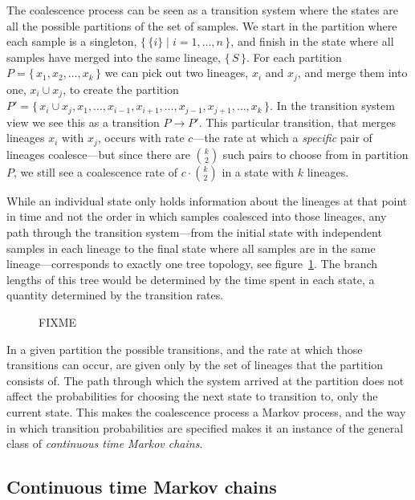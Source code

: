 The coalescence process can be seen as a transition system where the states are all the possible partitions of the set of samples. We start in the partition where each sample is a singleton, $\{\,\{i\}\;|\;i=1,\ldots,n\,\}$, and finish in the state where all samples have merged into the same lineage, $\{\,S\,\}$. For each partition $P=\{\,x_1,x_2,\ldots,x_k\,\}$ we can pick out two lineages, $x_i$ and $x_j$, and merge them into one, $x_i\cup x_j$, to create the partition $P'=\{\,x_i\cup x_j,x_1,\ldots,x_{i-1},x_{i+1},\ldots,x_{j-1},x_{j+1},\ldots,x_k\,\}$. In the transition system view we see this as a transition $P\to P'$. This particular transition, that merges lineages $x_i$ with $x_j$, occurs with rate $c$---the rate at which a \emph{specific} pair of lineages coalesce---but since there are $k \choose 2$ such pairs to choose from in partition $P$, we still see a coalescence rate of $c\cdot{k \choose 2}$ in a state with $k$ lineages.

While an individual state only holds information about the lineages at that point in time and not the order in which samples coalesced into those lineages, any path through the transition system---from the initial state with independent samples in each lineage to the final state where all samples are in the same lineage---corresponds to exactly one tree topology, see figure~\ref{fig:coal-no-recomb-transition-system}. The branch lengths of this tree would be determined by the time spent in each state, a quantity determined by the transition rates.

\begin{figure}[tb]
  \caption{FIXME}
  \label{fig:coal-no-recomb-transition-system}
\end{figure}


In a given partition the possible transitions, and the rate at which those transitions can occur, are given only by the set of lineages that the partition consists of. The path through which the system arrived at the partition does not affect the probabilities for choosing the next state to transition to, only the current state. This makes the coalescence process a Markov process, and the way in which transition probabilities are specified makes it an instance of the general class of \emph{continuous time Markov chains}.


\subsection{Continuous time Markov chains}

